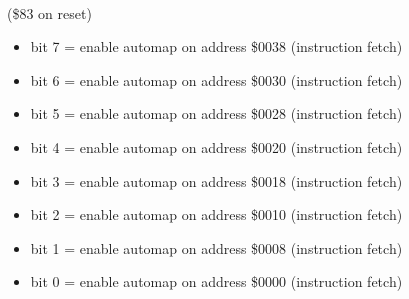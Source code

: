 \\
(\$83 on reset)
\begin{itemize}
\item bit 7 = enable automap on address \$0038 (instruction fetch)
\item bit 6 = enable automap on address \$0030 (instruction fetch)
\item bit 5 = enable automap on address \$0028 (instruction fetch)
\item bit 4 = enable automap on address \$0020 (instruction fetch)
\item bit 3 = enable automap on address \$0018 (instruction fetch)
\item bit 2 = enable automap on address \$0010 (instruction fetch)
\item bit 1 = enable automap on address \$0008 (instruction fetch)
\item bit 0 = enable automap on address \$0000 (instruction fetch)
\end{itemize}

